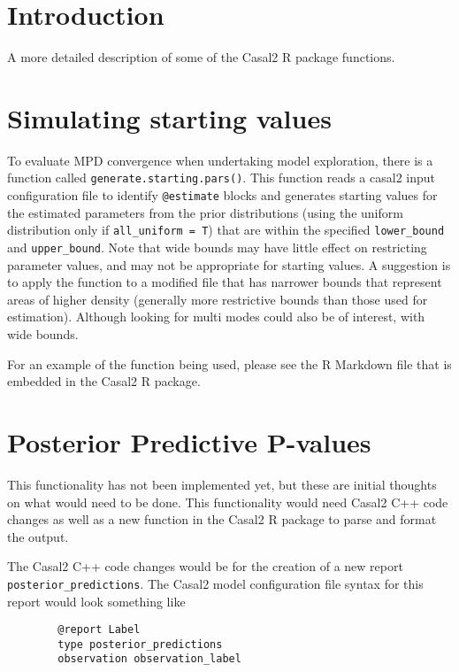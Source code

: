 \documentclass[12pt,preprint,authoryear]{article}
\begin{document}
\section{Introduction}

A more detailed description of some of the Casal2 R package functions.


\section{Simulating starting values}

To evaluate MPD convergence when undertaking model exploration, there is a function called \texttt{generate.starting.pars()}. This function reads a casal2 input configuration file to identify \texttt{@estimate} blocks and generates starting values for the estimated parameters from the prior distributions (using the uniform distribution only if \texttt{all\_uniform = T}) that are within the specified \texttt{lower\_bound} and \texttt{upper\_bound}. Note that wide bounds may have little effect on restricting parameter values, and may not be appropriate for starting values. A suggestion is to apply the function to a modified file that has narrower bounds that represent areas of higher density (generally more restrictive bounds than those used for estimation). Although looking for multi modes could also be of interest, with wide bounds.


For an example of the function being used, please see the R Markdown file that is embedded in the Casal2 R package.

\section{Posterior Predictive P-values}

This functionality has not been implemented yet, but these are initial thoughts on what would need to be done. This functionality would need Casal2 C++ code changes as well as a new function in the Casal2 R package to parse and format the output.

The Casal2 C++ code changes would be for the creation of a new report \texttt{posterior\_predictions}. The Casal2 model configuration file syntax for this report would look something like

{\small{\begin{verbatim}
		@report Label
		type posterior_predictions
		observation observation_label
		\end{verbatim}
	}
}
\end{document}
